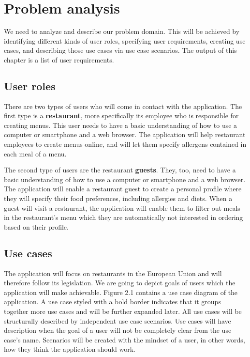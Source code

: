\chapter{Problem analysis}
We need to analyze and describe our problem domain.
This will be achieved by identifying different kinds of user roles, specifying user requirements, creating use cases, and describing those use cases via use case scenarios.
The output of this chapter is a list of user requirements.

\section{User roles}
There are two types of users who will come in contact with the application.
The first type is a \textbf{restaurant}, more specifically its employee who is responsible for creating menus.
This user needs to have a basic understanding of how to use a computer or smartphone and a web browser.
The application will help restaurant employees to create menus online, and will let them specify allergens contained in each meal of a menu.

The second type of users are the restaurant \textbf{guests}.
They, too, need to have a basic understanding of how to use a computer or smartphone and a web browser.
The application will enable a restaurant guest to create a personal profile where they will specify their food preferences, including allergies and diets.
When a guest will visit a restaurant, the application will enable them to filter out meals in the restaurant's menu which they are automatically not interested in ordering based on their profile.

\section{Use cases}
The application will focus on restaurants in the European Union and will therefore follow its legislation.
We are going to depict goals of users which the application will make achievable.
Figure 2.1 contains a use case diagram of the application.
A use case styled with a bold border indicates that it groups together more use cases and will be further expanded later.
All use cases will be structurally described by independent use case scenarios.
Use cases will have description when the goal of a user will not be completely clear from the use case's name.
Scenarios will be created with the mindset of a user, in other words, how they think the application should work.

